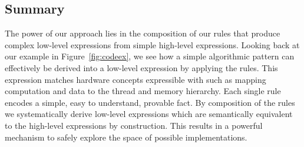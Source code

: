 \FloatBarrier



\subsection{Summary}

The power of our approach lies in the composition of our rules that produce complex low-level expressions from simple high-level expressions.
Looking back at our example in Figure~\ref{fig:codeex}, we see how a simple algorithmic pattern can effectively be derived into a low-level expression by applying the rules.
This expression matches hardware concepts expressible with \OpenCL such as mapping computation and data to the thread and memory hierarchy. %
Each single rule encodes a simple, easy to understand, provable fact.
By composition of the rules we systematically derive low-level expressions which are semantically equivalent to the high-level expressions by construction.
This results in a powerful mechanism to safely explore the space of possible implementations.


